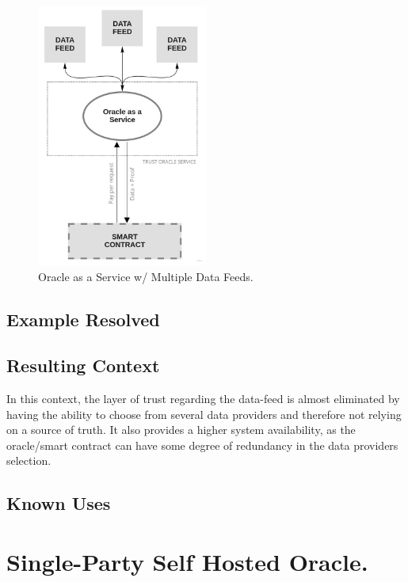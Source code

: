 \begin{figure}[t]
  \begin{center}
    \leavevmode
    \includegraphics[width=0.5\textwidth]{figures/oraclearch2.jpg}
    \caption{Oracle as a Service w/ Multiple Data Feeds.}
    \label{fig:/figures/paper-screening}
  \end{center}
\end{figure}

\subsection{Example Resolved}

\subsection{Resulting Context}
In this context, the layer of trust regarding the data-feed is almost eliminated by having the ability to choose from several data providers and therefore not relying on a source of truth. It also provides a higher system availability, as the oracle/smart contract can have some degree of redundancy in the data providers selection.

\subsection{Known Uses}

\section{Single-Party Self Hosted Oracle.}\label{SPSelfHostedOracle}

